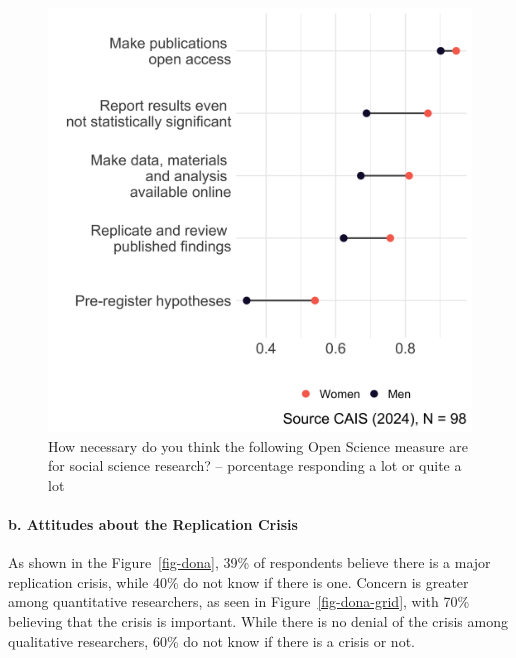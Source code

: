 \documentclass[
  letterpaper,
  DIV=11,
  numbers=noendperiod]{scrartcl}
\let\oldparagraph\paragraph
\renewcommand{\paragraph}[1]{\oldparagraph{#1}\mbox{}}
\begin{document}
\begin{figure}
\begin{minipage}[t]{0.50\linewidth}
{{\includegraphics{paper_files/figure-pdf/fig-vca-grid-2.png}

}

}

\end{minipage}%

\caption{\label{fig-vca-grid}How necessary do you think the following
Open Science measure are for social science research? -- porcentage
responding a lot or quite a lot}

\end{figure}

\hypertarget{b.-attitudes-about-the-replication-crisis}{%
\paragraph{b. Attitudes about the Replication
Crisis}\label{b.-attitudes-about-the-replication-crisis}}

As shown in the Figure~\ref{fig-dona}, 39\% of respondents believe there
is a major replication crisis, while 40\% do not know if there is one.
Concern is greater among quantitative researchers, as seen in
Figure~\ref{fig-dona-grid}, with 70\% believing that the crisis is
important. While there is no denial of the crisis among qualitative
researchers, 60\% do not know if there is a crisis or not.
\end{document}
